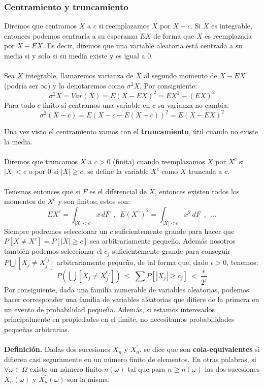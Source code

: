 \subsubsection{Centramiento y truncamiento}
Diremos que centramos $X$ a $c$ si reemplazamos $X$ por $X-c$. Si $X$ es integrable, entonces podemos centrarla a su esperanza $EX$ de forma que $X$ es reemplazada por $X-EX$. Es decir, diremos que una variable aleatoria está centrada a su media si y solo si su media existe y es igual a 0.
\\\\
Sea $X$ integrable, llamaremos varianza de $X$ al segundo momento de $X-EX$ (podría ser $\infty$) y lo denotaremos como $\sigma^2 X$. Por consiguiente:
$$\sigma^2 X = Var(X) = E(X-EX)^2=EX^2-(EX)^2$$
Para todo $c$ finito si centramos una variable en $c$ su varianza no cambia:
$$\sigma^2(X-c)=E(X-c-E(X-c))^2=E(X-EX)^2$$

Una vez visto el centramiento vamos con el \textbf{truncamiento}, útil cuando no existe la media.
\\\\
Diremos que truncamos $X$ a $c>0$ (finita) cuando reemplazamos $X$ por $X^c$ si $|X|<c$ o por $0$ si $|X|\geq c$, se define la variable $X^c$ como $X$ truncada a $c$. 
\\\\
Tenemos entonces que si $F$ es el diferencial de $X$, entonces existen todos los momentos de $X^c$ y son finitos; estos son:
$$EX^c=\int_{|X|<c}x\, dF\,\,\, , \,\,\, E(X^c)^2=\int_{|X|<c}x^2\, dF \,\,\, , \,\,\,  \ldots$$
Siempre podremos seleccionar un $c$ suficientemente grande para hacer que $P[X\neq X^c]=P[|X|\geq c]$ sea arbitrariamente pequeño. Además nosotros también podemos seleccionar el $c_j$ suficientemente grande para conseguir $P\bigcup [X_j\neq X_j^{c_j}]$ arbitrariamente pequeño, de tal forma que, dado $\epsilon > 0$, tenemos:
$$P\left( 
\bigcup [X_j\neq X_j^{c_j}] \right)
\ \leq \ 
\sum P[|X_j|\geq c_j] 
\ < \
\frac{\epsilon}{2^j}$$
Por consiguiente, dada una familia numerable de variables aleatorias, podemos hacer corresponder una familia de variables aleatorias que difiere de la primera en un evento de probabilidad pequeña. Además, si estamos interesados principalmente en propiedades en el límite, no necesitamos probabilidades pequeñas arbitrarias.
\\\\
\textbf{Definición. }Dadas dos sucesiones $X_n$ y $X_n^{\prime}$, se dice que son \textbf{cola-equivalentes} si difieren casi seguramente en un número finito de elementos.
En otras palabras, si $\forall \omega\in\Omega$ existe un número finito $n(\omega)$ tal que para $n\geq n(\omega)$ las dos sucesiones $X_n(\omega)$ y $X_n^{\prime}(\omega)$ son la misma.

